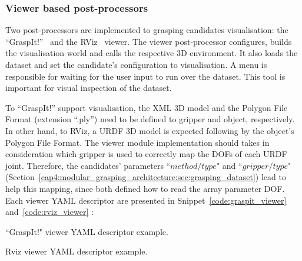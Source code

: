 \subsubsection{Viewer based post-processors}
\label{cap4:modular_grasping_architecture:sec:grasping_synthesis:subsec:postprocessor:subsubsec:viewers}

Two post-processors are implemented to grasping candidates visualisation: the ``GraspIt!''~\cite{miller2004graspit} and the RViz~\cite{rviz} viewer. The viewer post-processor configures, builds the visualisation world and calls the respective 3D environment. It also loads the dataset and set the candidate's configuration to visualisation. A menu is responsible for waiting for the user input to run over the dataset. This tool is important for visual inspection of the dataset.

To ``GraspIt!'' support visualisation, the XML 3D model and the Polygon File Format (extension ``.ply'') need to be defined to gripper and object, respectively. In other hand, to RViz, a URDF 3D model is expected following by the object's Polygon File Format. The viewer module implementation should takes in consideration which gripper is used to correctly map the DOFs of each URDF joint. Therefore, the candidates' parameters ``$method/type$" and ``$gripper/type$"  (Section~\ref{cap4:modular_grasping_architecture:sec:grasping_dataset}) lead to help this mapping, since both defined how to read the array parameter \ac{DOF}. Each viewer YAML descriptor are presented in Snippet~\ref{code:graspit_viewer} and~\ref{code:rviz_viewer} : 

\begin{snippet}[h!]
\centering
{}
\caption{``GraspIt!" viewer YAML descriptor example.}
\label{code:graspit_viewer}
\end{snippet}

\begin{snippet}[h!]
\centering
{}
\caption{Rviz viewer YAML descriptor example.}
\label{code:rviz_viewer}
\end{snippet}

